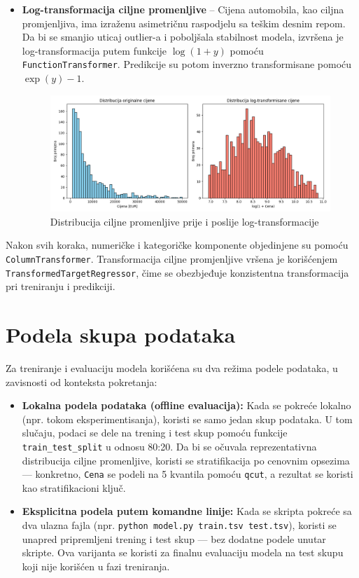 \documentclass[a4paper,12pt]{article}
\begin{document}
\begin{itemize}
    \item \textbf{Log-transformacija ciljne promenljive} – Cijena automobila, kao ciljna promjenljiva, ima izraženu asimetričnu raspodjelu sa teškim desnim repom. Da bi se smanjio uticaj outlier-a i poboljšala stabilnost modela, izvršena je log-transformacija putem funkcije $\log(1 + y)$ pomoću \texttt{FunctionTransformer}. Predikcije su potom inverzno transformisane pomoću $\exp(y) - 1$.
	\begin{figure}[H]
	    \centering
	    \includegraphics[width=\textwidth]{log_transformacija_cena.png}
	    \caption{Distribucija ciljne promenljive prije i poslije log-transformacije}
	    \label{fig:log_transform}
	\end{figure}
\end{itemize}

Nakon svih koraka, numeričke i kategoričke komponente objedinjene su pomoću \texttt{ColumnTransformer}. Transformacija ciljne promjenljive vršena je korišćenjem \texttt{TransformedTargetRegressor}, čime se obezbjeđuje konzistentna transformacija pri treniranju i predikciji.

\section{Podela skupa podataka}

Za treniranje i evaluaciju modela korišćena su dva režima podele podataka, u zavisnosti od konteksta pokretanja:

\begin{itemize}
    \item \textbf{Lokalna podela podataka (offline evaluacija):} Kada se pokreće lokalno (npr. tokom eksperimentisanja), koristi se samo jedan skup podataka. U tom slučaju, podaci se dele na trening i test skup pomoću funkcije \texttt{train\_test\_split} u odnosu 80:20. Da bi se očuvala reprezentativna distribucija ciljne promenljive, koristi se stratifikacija po cenovnim opsezima — konkretno, \texttt{Cena} se podeli na 5 kvantila pomoću \texttt{qcut}, a rezultat se koristi kao stratifikacioni ključ.

    \item \textbf{Eksplicitna podela putem komandne linije:} Kada se skripta pokreće sa dva ulazna fajla (npr. \texttt{python model.py train.tsv test.tsv}), koristi se unapred pripremljeni trening i test skup — bez dodatne podele unutar skripte. Ova varijanta se koristi za finalnu evaluaciju modela na test skupu koji nije korišćen u fazi treniranja.
\end{itemize}
\end{document}
